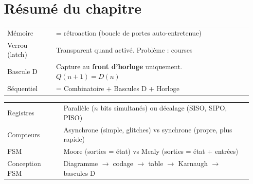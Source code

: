 \documentclass[12pt,a4paper,twoside]{book}
\begin{document}
\section*{Résumé du chapitre}

\begin{bases}[title={\color{white} Résumé --- Les Bases}]
\begin{center}
\renewcommand{\arraystretch}{1.3}
\begin{tabular}{p{3.5cm}p{9.5cm}}
\toprule
Mémoire & = rétroaction (boucle de portes auto-entretenue) \\
Verrou (latch) & Transparent quand activé. Problème : courses \\
Bascule D & Capture au \textbf{front d'horloge} uniquement. $Q(n+1) = D(n)$ \\
Séquentiel & = Combinatoire + Bascules D + Horloge \\
\bottomrule
\end{tabular}
\end{center}
\end{bases}

\begin{approfondissement}[title={\color{white} Résumé --- Approfondissement}]
\begin{center}
\renewcommand{\arraystretch}{1.3}
\begin{tabular}{p{3.5cm}p{9.5cm}}
\toprule
Registres & Parallèle ($n$ bits simultanés) ou décalage (SISO, SIPO, PISO) \\
Compteurs & Asynchrone (simple, glitches) vs synchrone (propre, plus rapide) \\
FSM & Moore (sorties = état) vs Mealy (sorties = état + entrées) \\
Conception FSM & Diagramme $\to$ codage $\to$ table $\to$ Karnaugh $\to$ bascules D \\
\bottomrule
\end{tabular}
\end{center}
\end{approfondissement}
\end{document}
